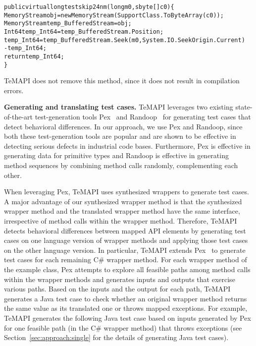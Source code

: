\begin{CodeOut}%
\begin{alltt}
public virtual long testskip24nm(long m0, sbyte[] c0)\{
  MemoryStream obj = new MemoryStream(SupportClass.ToByteArray(c0));
  MemoryStream temp_BufferedStream = obj;
  Int64 temp_Int64 = temp_BufferedStream.Position;
  temp_Int64 = temp_BufferedStream.Seek(m0, System.IO.SeekOrigin.Current)
               - temp_Int64;
  return temp_Int64;
\}
\end{alltt}
\end{CodeOut}%

TeMAPI does not remove this method, since it does not result in compilation errors.

\textbf{Generating and translating test cases.}  TeMAPI leverages two existing state-of-the-art test-generation tools Pex~\cite{tillmann2008pex} and Randoop~\cite{pacheco2007feedback} for generating test cases that detect behavioral differences. In our approach, we use Pex and Randoop, since both these test-generation tools are popular and are shown to be effective in detecting serious defects in industrial code bases. Furthermore, Pex is effective in generating data for primitive types and Randoop is effective in generating method sequences by combining method calls randomly, complementing each other.

When leveraging Pex, TeMAPI uses synthesized wrappers to generate test cases. A major advantage of our synthesized wrapper method is that the synthesized wrapper method and the translated wrapper method have the same interface, irrespective of method calls within the wrapper method. Therefore, TeMAPI detects behavioral differences between mapped API elements by generating test cases on one language version of wrapper methods and applying those test cases on the other language version. In particular, TeMAPI extends Pex~\cite{tillmann2008pex} to generate test cases for each remaining C\# wrapper method. For each wrapper method of the example class, Pex attempts to explore all feasible paths among method calls within the wrapper methods and generates inputs and outputs that exercise various paths. Based on the inputs and the output for each path, TeMAPI generates a Java test case to check whether an original wrapper method returns the same value as its translated one or throws mapped exceptions. For example, TeMAPI generates the following Java test case based on inputs generated by Pex for one feasible path (in the C\# wrapper method) that throws exceptions (see Section~\ref{sec:approach:single} for the details of generating Java test cases).

